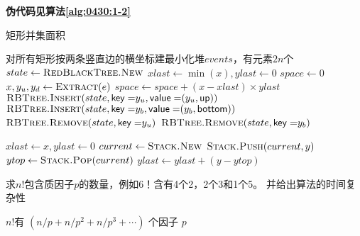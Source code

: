 \begin{questions}
\begin{parts}
\begin{solution}
            \textbf{伪代码见算法\ref{alg:0430:1-2}}
        \end{solution}

        \begin{algorithm}[!htp]
            \caption{矩形并集面积}\label{alg:0430:1-2}
            \begin{algorithmic}[1]
                 
                \State 对所有矩形按两条竖直边的横坐标建最小化堆$events$，有元素$2n$个 
                \State $state \gets \Call{RedBlackTree.New}{}$
                \State $xlast \gets \min(x), ylast \gets 0$
                \State $space \gets 0$
                \State $x, y_u, y_d \gets \Call{Extract}{e}$
                \State $space \gets space + (x-xlast) \times ylast$
                 
                \State $\Call{RBTree.Insert}{state, \mathsf{key=}y_u, \mathsf{value=}(y_u, \mathsf{up})}$
                \State $\Call{RBTree.Insert}{state, \mathsf{key=}y_b, \mathsf{value=}(y_b, \mathsf{bottom})}$
                 
                \State $\Call{RBTree.Remove}{state, \mathsf{key=}y_u}$
                \State $\Call{RBTree.Remove}{state, \mathsf{key=}y_b}$
                \EndIf

                \State $xlast \gets x, ylast \gets 0$ 
                \State $current \gets \Call{Stack.New}{}$
                \State $\Call{Stack.Push}{current, y}$
                \State $ytop \gets \Call{Stack.Pop}{current}$
                \State $ylast \gets ylast + (y - ytop)$
                \EndIf
                \EndIf
                \EndFor
                \EndFor
            \end{algorithmic}
        \end{algorithm}
    \end{parts}

    \question 求$n!$包含质因子$p$的数量，例如$6！$含有4个2，2个3和1个5。
    并给出算法的时间复杂性

    \begin{solution}
        $n!$有 $\left(n / p+n / p^{2}+n / p^{3}+\cdots\right)$ 个因子 $p$


\end{solution}
\end{questions}
